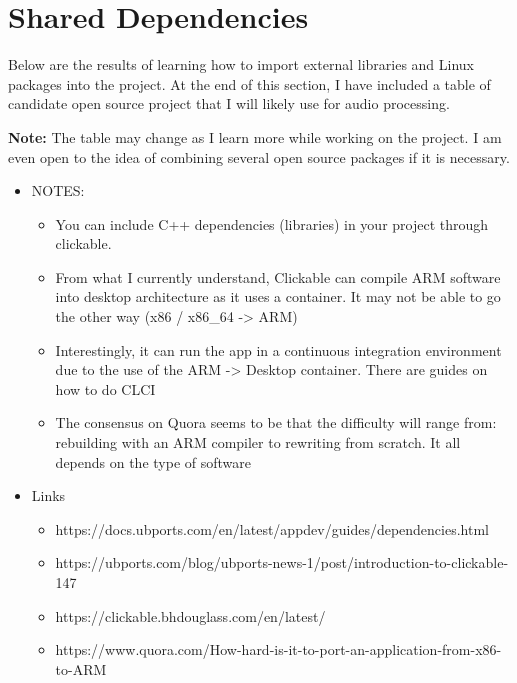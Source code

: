 \section{Shared Dependencies}


Below are the results of learning how to import external libraries and Linux packages into the project. At the end of this section, I have included a table of candidate open source project that I will likely use for audio processing. 

\textbf{Note:} The table may change as I learn more while working on the project. I am even open to the idea of combining several open source packages if it is necessary.


\begin{itemize}
	\item NOTES:
	\begin{itemize}
		\item You can include C++ dependencies (libraries) in your project through clickable.
		\item From what I currently understand, Clickable can compile ARM software into desktop architecture as it uses a container. It may not be able to go the other way (x86 / x86\_64 -> ARM)
		\item Interestingly, it can run the app in a continuous integration environment due to the use of the ARM -> Desktop container. There are guides on how to do CLCI
		\item The consensus on Quora seems to be that the difficulty will range from: rebuilding with an ARM compiler to rewriting from scratch. It all depends on the type of software
	\end{itemize}
\end{itemize}



\begin{itemize}
	\item Links
	\begin{itemize}
		\item https://docs.ubports.com/en/latest/appdev/guides/dependencies.html
		\item https://ubports.com/blog/ubports-news-1/post/introduction-to-clickable-147
		\item https://clickable.bhdouglass.com/en/latest/
		\item https://www.quora.com/How-hard-is-it-to-port-an-application-from-x86-to-ARM
	\end{itemize}
\end{itemize}




